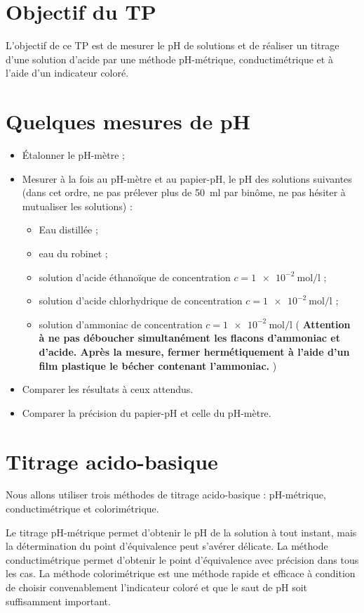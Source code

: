 \documentclass{tp}
\begin{document}


\section{Objectif du TP}
L'objectif de ce TP est de mesurer le pH de solutions et de réaliser un titrage d'une solution d'acide par une méthode pH-métrique, conductimétrique et à l'aide d'un indicateur coloré.

\section{Quelques mesures de pH}
\begin{itemize}
  \item Étalonner le pH-mètre ;
  \item Mesurer à la fois au pH-mètre et au papier-pH, le pH des solutions suivantes (dans cet ordre, ne pas prélever plus de \SI{50}{\milli\litre} par binôme, ne pas hésiter à mutualiser les solutions) :
  \begin{itemize}
    \item Eau distillée ;
    \item eau du robinet ;
    \item solution d'acide éthanoïque de concentration $c=\SI{1e-2}{\mol\per\litre}$ ;
    \item solution d'acide chlorhydrique de concentration $c=\SI{1e-2}{\mol\per\litre}$ ;
    \item solution d'ammoniac de concentration $c=\SI{1e-2}{\mol\per\litre}$ ( \textbf{Attention à ne pas déboucher simultanément les flacons d'ammoniac et d'acide. Après la mesure, fermer hermétiquement à l'aide d'un film plastique le bécher contenant l'ammoniac.}  )
  \end{itemize}
\item Comparer les résultats à ceux attendus.
\item Comparer la précision du papier-pH et celle du pH-mètre.
\end{itemize}

\section{Titrage acido-basique}%
\label{sec:titrage_acido_basique}

Nous allons utiliser trois méthodes de titrage acido-basique : pH-métrique, conductimétrique et colorimétrique. 

Le titrage pH-métrique permet d'obtenir le pH de la solution à tout instant, mais la détermination du point d'équivalence peut s'avérer délicate. La méthode conductimétrique permet d'obtenir le point d'équivalence avec précision dans tous les cas. La méthode colorimétrique est une méthode rapide et efficace à condition de choisir convenablement l'indicateur coloré et que le saut de pH soit suffisamment important.
\end{document}
